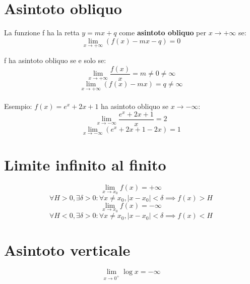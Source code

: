 \section{Asintoto obliquo}
La funzione f ha la retta \(y = mx + q\) come \textbf{asintoto obliquo} per \(x \to +\infty\) se:
\[\lim_{x \to +\infty} (f(x) - mx - q) = 0\]

f ha asintoto obliquo se e solo se:
\[\lim_{x \to +\infty} \frac{f(x)}{x} = m \neq 0 \neq \infty\]
\[\lim_{x \to +\infty} (f(x) - mx) = q \neq \infty\]
\\
Esempio:
\(f(x) = e^x + 2x + 1\) ha asintoto obliquo se \(x \to -\infty\):\\
\[\lim_{x \to -\infty} \frac{e^x + 2x + 1}{x} = 2\]
\[\lim_{x \to -\infty} (e^x + 2x + 1 - 2x) = 1\]

\section{Limite infinito al finito}
\[\lim_{x \to x_0} f(x) = +\infty\]
\[\forall H > 0, \exists \delta > 0 : \forall x \neq x_0, | x - x_0 | < \delta \implies f(x) > H\]
\[\lim_{x \to x_0} f(x) = -\infty\]
\[\forall H < 0, \exists \delta > 0 : \forall x \neq x_0, | x - x_0 | < \delta \implies f(x) < H\]

\section{Asintoto verticale}
\[\lim_{x \to 0^+} \log x = -\infty\]
